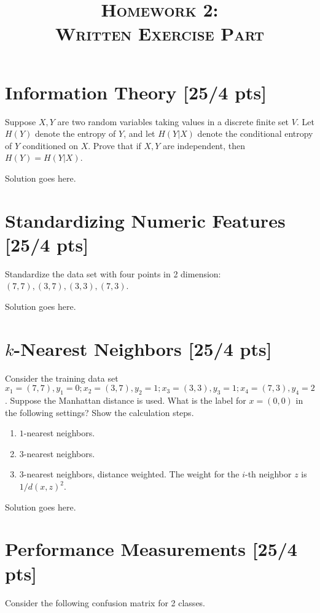 \documentclass[a4paper]{article}
\title{\textsc{Homework 2: \\ Written Exercise Part}} %
\date{}
\theoremstyle{definition}
\newenvironment{soln}{
    \leavevmode\color{blue}\ignorespaces
}{}
\begin{document}
\maketitle 


\section{Information Theory [25/4 pts]}
Suppose $X, Y$ are two random variables taking values in a discrete finite set $V$. Let $H(Y)$ denote the entropy of $Y$, and let $H(Y|X)$ denote the conditional entropy of $Y$ conditioned on $X$. Prove that if $X, Y$ are independent, then $H(Y)=H(Y|X)$.

\begin{soln}  Solution goes here. \end{soln}


\section{Standardizing Numeric Features [25/4 pts]}
Standardize the data set with four points in 2 dimension: $(7, 7), (3, 7), (3, 3), (7, 3)$.

\begin{soln}  Solution goes here. \end{soln}


\section{$k$-Nearest Neighbors [25/4 pts]}
Consider the training data set $x_1 = (7, 7), y_1 = 0; x_2 =  (3, 7), y_2 = 1; x_3 = (3, 3), y_3 = 1; x_4 = (7, 3), y_4 = 2$. Suppose the Manhattan distance is used. What is the label for $x = (0, 0)$ in the following settings? Show the calculation steps.
\begin{enumerate}
	\item $1$-nearest neighbors.
	\item $3$-nearest neighbors.
	\item $3$-nearest neighbors, distance weighted. The weight for the $i$-th neighbor $z$ is $1/d(x, z)^2$.
\end{enumerate}

\begin{soln}  Solution goes here. \end{soln}


\section{Performance Measurements [25/4 pts]}
Consider the following confusion matrix for 2 classes.
\end{document}
